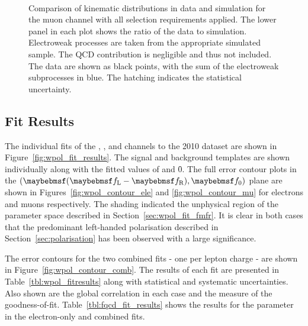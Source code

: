 \begin{figure}[t]
\centering
{}
\\
\caption{Comparison of kinematic distributions in data and simulation for the
  muon channel with all selection requirements applied. The lower panel in each
  plot shows the ratio of the data to simulation. Electroweak processes are
  taken from the appropriate simulated sample. The \ac{QCD} contribution is
  negligible and thus not included. The data are shown as black points, with the
  sum of the electroweak subprocesses in blue. The hatching indicates the
  statistical uncertainty.}
\label{fig:wpol_datamc_mu}
\end{figure}




\subsection{Fit Results}
The individual fits of the \Pep, \Pem, \Pgmp and \Pgmm channels to the 2010
dataset are shown in Figure~\ref{fig:wpol_fit_results}. The signal and
background templates are shown individually along with the fitted values of
\fLmfR and \f0. The full error contour plots in the $(\fLmfR, \f0)$ plane are
shown in Figures~\ref{fig:wpol_contour_ele} and \ref{fig:wpol_contour_mu} for
electrons and muons respectively. The shading indicated the unphysical region of
the parameter space described in Section~\ref{sec:wpol_fit_fmfr}. It is clear in
both cases that the predominant left-handed polarisation described in
Section~\ref{sec:polarisation} has been observed with a large significance.

The error contours for the two combined fits - one per lepton charge - are shown
in Figure~\ref{fig:wpol_contour_comb}. The results of each fit are presented in
Table~\ref{tbl:wpol_fitresults} along with statistical and systematic
uncertainties. Also shown are the global correlation in each case and the \chisq
measure of the goodness-of-fit. Table~\ref{tbl:fqcd_fit_results} shows the
results for the parameter \fQCD in the electron-only and combined fits.

